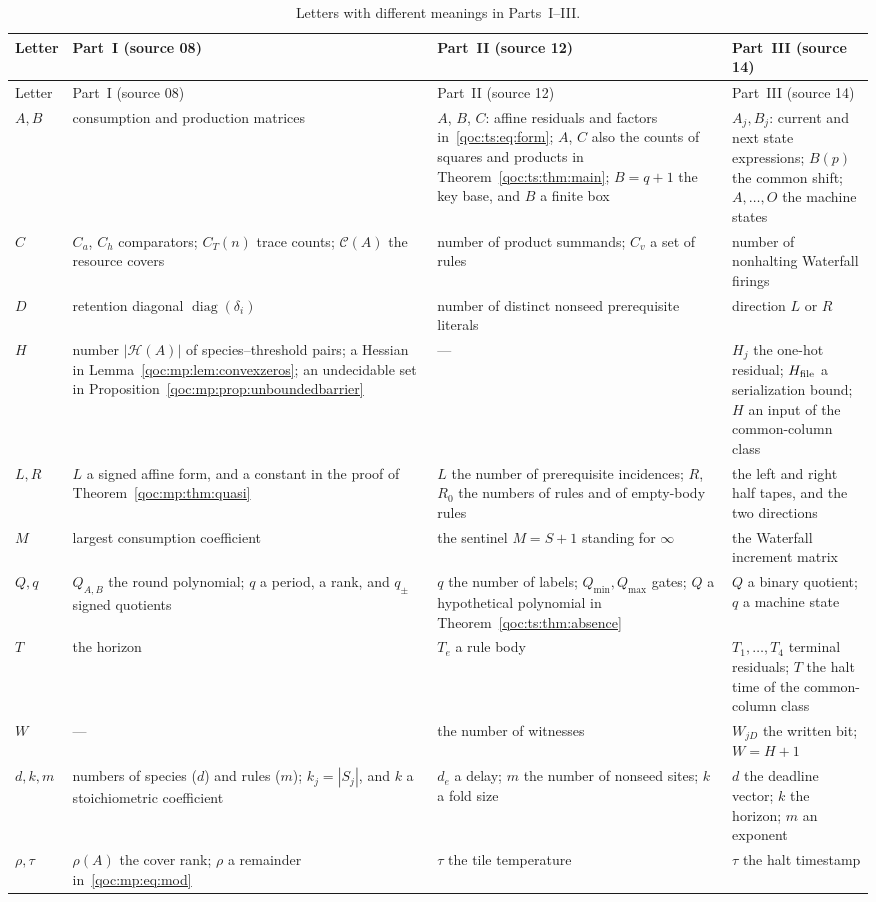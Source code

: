 \documentclass[11pt,letterpaper]{article}
\theoremstyle{definition}
\theoremstyle{remark}
\newcommand{\diag}{\operatorname{diag}}
\newcommand{\cH}{\mathcal H}
\newcommand{\cC}{\mathcal C}
\newcommand{\minpen}{Q_{\min}}
\newcommand{\maxpen}{Q_{\max}}
\begin{document}
\begin{longtable}{@{}L{0.07\textwidth}L{0.28\textwidth}L{0.28\textwidth}L{0.28\textwidth}@{}}
\caption{Letters with different meanings in Parts~I--III.}\label{qoc:tab:letters}\\
\toprule
Letter & Part~I (source 08) & Part~II (source 12) & Part~III (source 14)\\\midrule\endfirsthead
\toprule
Letter & Part~I (source 08) & Part~II (source 12) & Part~III (source 14)\\\midrule\endhead
$A,B$ & consumption and production matrices & $A$, $B$, $C$: affine residuals and factors in~\eqref{qoc:ts:eq:form}; $A$, $C$ also the counts of squares and products in Theorem~\ref{qoc:ts:thm:main}; $B=q+1$ the key base, and $B$ a finite box & $A_j,B_j$: current and next state expressions; $B(p)$ the common shift; $A,\ldots,O$ the machine states \\
$C$ & $C_a$, $C_h$ comparators; $C_T(n)$ trace counts; $\cC(A)$ the resource covers & number of product summands; $C_v$ a set of rules & number of nonhalting Waterfall firings \\
$D$ & retention diagonal $\diag(\delta_i)$ & number of distinct nonseed prerequisite literals & direction $L$ or $R$ \\
$H$ & number $|\cH(A)|$ of species--threshold pairs; a Hessian in Lemma~\ref{qoc:mp:lem:convexzeros}; an undecidable set in Proposition~\ref{qoc:mp:prop:unboundedbarrier} & --- & $H_j$ the one-hot residual; $H_{\rm file}$ a serialization bound; $H$ an input of the common-column class \\
$L,R$ & $L$ a signed affine form, and a constant in the proof of Theorem~\ref{qoc:mp:thm:quasi} & $L$ the number of prerequisite incidences; $R$, $R_0$ the numbers of rules and of empty-body rules & the left and right half tapes, and the two directions \\
$M$ & largest consumption coefficient & the sentinel $M=S+1$ standing for $\infty$ & the Waterfall increment matrix \\
$Q,q$ & $Q_{A,B}$ the round polynomial; $q$ a period, a rank, and $q_\pm$ signed quotients & $q$ the number of labels; $\minpen,\maxpen$ gates; $Q$ a hypothetical polynomial in Theorem~\ref{qoc:ts:thm:absence} & $Q$ a binary quotient; $q$ a machine state \\
$T$ & the horizon & $T_e$ a rule body & $T_1,\ldots,T_4$ terminal residuals; $T$ the halt time of the common-column class \\
$W$ & --- & the number of witnesses & $W_{jD}$ the written bit; $W=H+1$ \\
$d,k,m$ & numbers of species ($d$) and rules ($m$); $k_j=|S_j|$, and $k$ a stoichiometric coefficient & $d_e$ a delay; $m$ the number of nonseed sites; $k$ a fold size & $d$ the deadline vector; $k$ the horizon; $m$ an exponent \\
$\rho,\tau$ & $\rho(A)$ the cover rank; $\rho$ a remainder in~\eqref{qoc:mp:eq:mod} & $\tau$ the tile temperature & $\tau$ the halt timestamp \\
\bottomrule
\end{longtable}
\end{document}
